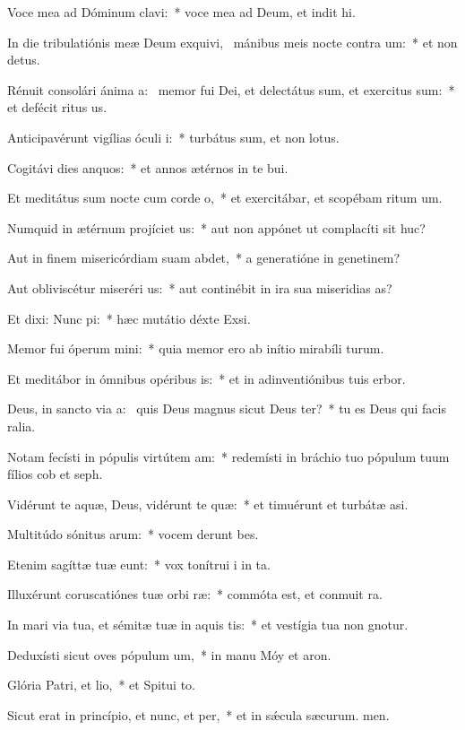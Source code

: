 \item Voce mea ad Dóminum clavi:~* voce mea ad Deum, et indit hi.
\item In die tribulatiónis meæ Deum exquivi,~\pscross{} mánibus meis nocte contra um:~* et non  detus.
\item Rénuit consolári ánima a:~\pscross{} memor fui Dei, et delectátus sum, et exercitus sum:~* et defécit ritus us.
\item Anticipavérunt vigílias óculi i:~* turbátus sum, et non  lotus.
\item Cogitávi dies anquos:~* et annos ætérnos in te bui.
\item Et meditátus sum nocte cum corde o,~* et exercitábar, et scopébam ritum um.
\item Numquid in ætérnum projíciet us:~* aut non appónet ut complacíti sit huc?
\item Aut in finem misericórdiam suam abdet,~* a generatióne in genetinem?
\item Aut obliviscétur miseréri us:~* aut continébit in ira sua miseridias as?
\item Et dixi: Nunc pi:~* hæc mutátio déxte Exsi.
\item Memor fui óperum mini:~* quia memor ero ab inítio mirabíli turum.
\item Et meditábor in ómnibus opéribus is:~* et in adinventiónibus tuis erbor.
\item Deus, in sancto via a:~\pscross{} quis Deus magnus sicut Deus ter?~* tu es Deus qui facis ralia.
\item Notam fecísti in pópulis virtútem am:~* redemísti in bráchio tuo pópulum tuum fílios cob et seph.
\item Vidérunt te aquæ, Deus, vidérunt te quæ:~* et timuérunt et turbátæ  asi.
\item Multitúdo sónitus arum:~* vocem derunt bes.
\item Etenim sagíttæ tuæ eunt:~* vox tonítrui i in ta.
\item Illuxérunt coruscatiónes tuæ orbi ræ:~* commóta est, et conmuit ra.
\item In mari via tua, et sémitæ tuæ in aquis tis:~* et vestígia tua non gnotur.
\item Deduxísti sicut oves pópulum um,~* in manu Móy et aron.
\item Glória Patri, et lio,~* et Spitui to.
\item Sicut erat in princípio, et nunc, et per,~* et in sǽcula sæcurum. men.
